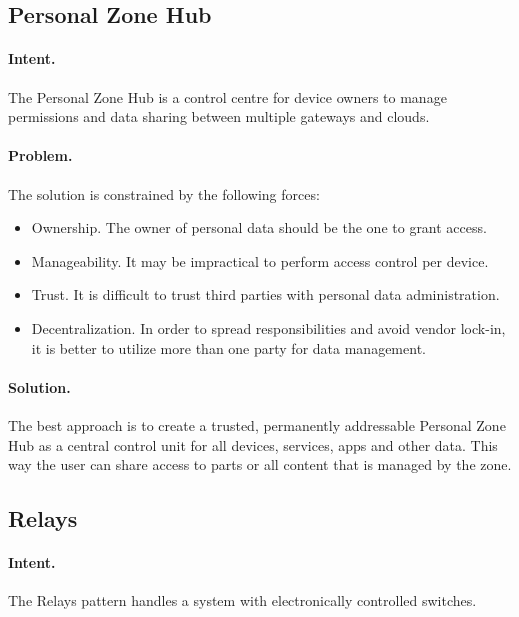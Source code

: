 \subsection{Personal Zone Hub~\cite{Reinfurt20172}} 
\label{p:hub}

\paragraph{\textbf{Intent.}} The Personal Zone Hub is a control centre for device owners to manage permissions and data sharing between multiple gateways and clouds. 

\paragraph{\textbf{Problem.}} The solution is constrained by the following forces:
\begin{itemize}
	\item Ownership. The owner of personal data should be the one to grant access.
	\item Manageability. It may be impractical to perform access control per device.
	\item Trust. It is difficult to trust third parties with personal data administration.
	\item Decentralization. In order to spread responsibilities and avoid vendor lock-in, it is better to utilize more than one party for data management.
\end{itemize}

\paragraph{\textbf{Solution.}} The best approach is to create a trusted, permanently addressable Personal Zone Hub as a central control unit for all devices, services, apps and other data. This way the user can share access to parts or all content that is managed by the zone. 


\subsection{Relays~\cite{Fernandez2007}} 
\label{p:relays}

\paragraph{\textbf{Intent.}} The Relays pattern handles a system with electronically controlled switches.

